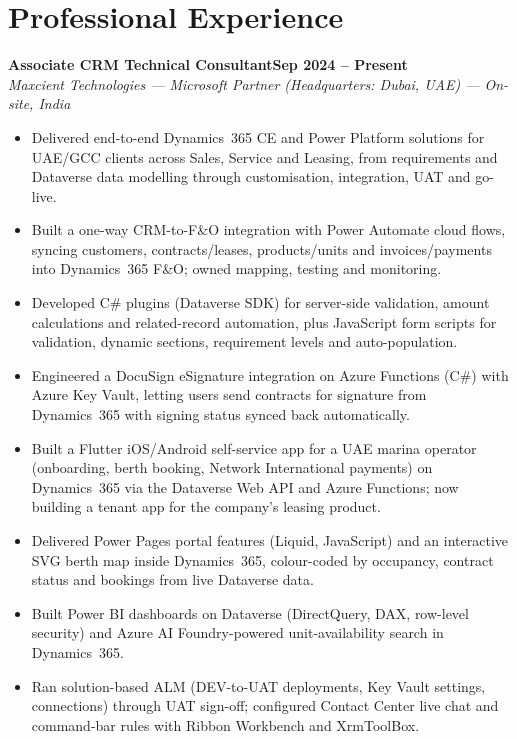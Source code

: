 \documentclass[10pt,a4paper]{article}
\newcommand{\job}[3]{%
  \Needspace{5\baselineskip}%
  \textbf{#1}\hfill\textbf{#2}\\
  \textit{#3}\par\vspace{1pt}
}
\begin{document}
\section*{Professional Experience}
\job{Associate CRM Technical Consultant}{Sep 2024 -- Present}{Maxcient Technologies --- Microsoft Partner (Headquarters: Dubai, UAE) --- On-site, India}
\begin{itemize}
  \item Delivered end-to-end Dynamics~365 CE and Power Platform solutions for UAE/GCC clients across Sales, Service and Leasing, from requirements and Dataverse data modelling through customisation, integration, UAT and go-live.
  \item Built a one-way CRM-to-F\&O integration with Power Automate cloud flows, syncing customers, contracts/leases, products/units and invoices/payments into Dynamics~365 F\&O; owned mapping, testing and monitoring.
  \item Developed C\# plugins (Dataverse SDK) for server-side validation, amount calculations and related-record automation, plus JavaScript form scripts for validation, dynamic sections, requirement levels and auto-population.
  \item Engineered a DocuSign eSignature integration on Azure Functions (C\#) with Azure Key Vault, letting users send contracts for signature from Dynamics~365 with signing status synced back automatically.
  \item Built a Flutter iOS/Android self-service app for a UAE marina operator (onboarding, berth booking, Network International payments) on Dynamics~365 via the Dataverse Web API and Azure Functions; now building a tenant app for the company's leasing product.
  \item Delivered Power Pages portal features (Liquid, JavaScript) and an interactive SVG berth map inside Dynamics~365, colour-coded by occupancy, contract status and bookings from live Dataverse data.
  \item Built Power BI dashboards on Dataverse (DirectQuery, DAX, row-level security) and Azure AI Foundry-powered unit-availability search in Dynamics~365.
  \item Ran solution-based ALM (DEV-to-UAT deployments, Key Vault settings, connections) through UAT sign-off; configured Contact Center live chat and command-bar rules with Ribbon Workbench and XrmToolBox.
\end{itemize}
\end{document}
